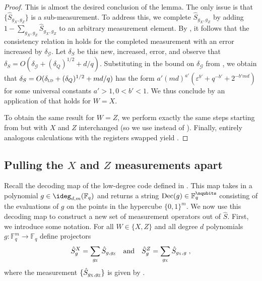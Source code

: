 \documentclass[11pt]{article}
\theoremstyle{definition}
\newcommand{\F}{\ensuremath{\mathbb{F}}}
\newcommand{\ld}{\textsc{ld}}
\newcommand{\mG}{\ensuremath{\mathcal{G}}}
\newcommand{\eps}{\varepsilon}
\newcommand{\labelstyle}[1]{\ensuremath{\textsc{#1}}\xspace}
\newcommand{\xpt}{\labelstyle{X}}
\newcommand{\zpt}{\labelstyle{Z}}
\newcommand{\coded}{\mathrm{Dec}}
\begin{document}
\begin{proof}
        This is almost the desired conclusion of the lemma. The only issue is that $\{\hat{S}_{g_X, g_Z}\}$ is a sub-measurement. To address this, we complete $\hat{S}_{g_X, g_Z}$ by adding $1 - \sum_{g_X, g_Z} \hat{S}_{g_X, g_Z}$ to an arbitrary measurement element. By , it follows that the consistency relation in  holds for the completed measurement with an error increased by $\delta_{\mG}$. Let $\delta_S$ be this new, increased, error, and observe that $\delta_S = O(\delta_{\mG} + (\delta_Q)^{1/2} + d/q)$. Substituting in the bound on $\delta_{\mG}$ from , we obtain that $\delta_S = O(\delta_\ld + (\delta_Q)^{1/2} + md/q)$ has the form $a' (md)^{a'} (\eps^{b'} + q^{-b'} + 2^{-b'md})$ for some universal constants $a' > 1, 0 < b' < 1$. We thus conclude by an application of  that  holds for $W = X$.

        To obtain the same result for $W = Z$, we perform exactly the same steps starting from  but with $X$ and $Z$ interchanged (so we use  instead of ). Finally, entirely analogous calculations with the registers swapped yield .

        




	
	
\end{proof}

 \subsection{Pulling the $X$ and $Z$ measurements apart}
\label{sec:separating}


Recall the decoding map of the low-degree code defined in . This map takes in a polynomial $g \in \ideg_{d,m}(\F_q)$ and returns a string $\coded(g) \in \F_q^{\nqubits}$ consisting of the evaluations of $g$ on the points in the hypercube $\{0,1\}^m$.
We now use this decoding map to construct a new set of measurement operators out of $\hat{S}$.
First, we introduce some notation. For all $W \in \{X,Z\}$ and all degree $d$ polynomials $g: \F_q^m \to \F_q$ define projectors
\[ \hat{S}^X_g = \sum_{g_\zpt} \hat{S}_{g,g_\zpt} \quad  \text{and}  \quad \hat{S}^Z_g = \sum_{g_\xpt} \hat{S}_{g_\xpt,g}\;,\]
where the measurement $\{\hat{S}_{g_\xpt,g_\zpt} \}$  is given by .
\end{document}
